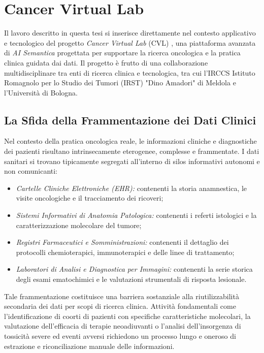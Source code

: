 \documentclass[12pt,a4paper,openright,twoside]{book}
\begin{document}
\section{Cancer Virtual Lab}
\label{sec:bg-cvl}

Il lavoro descritto in questa tesi si inserisce direttamente nel contesto
applicativo e tecnologico del progetto \textit{Cancer Virtual Lab} (CVL)
\cite{cvl2025platform}, una piattaforma avanzata di \textit{AI Semantica}
progettata per supportare la ricerca oncologica e la pratica clinica guidata dai
dati. Il progetto è frutto di una collaborazione multidisciplinare tra enti di
ricerca clinica e tecnologica, tra cui l'IRCCS Istituto Romagnolo per lo Studio
dei Tumori (IRST) "Dino Amadori" di Meldola e l'Università di Bologna.

\subsection{La Sfida della Frammentazione dei Dati Clinici}
Nel contesto della pratica oncologica reale, le informazioni cliniche e
diagnostiche dei pazienti risultano intrinsecamente eterogenee, complesse e
frammentate. I dati sanitari si trovano tipicamente segregati all'interno di
silos informativi autonomi e non comunicanti:
\begin{itemize}
    \item \textit{Cartelle Cliniche Elettroniche (EHR):} contenenti la storia
          anamnestica, le visite oncologiche e il tracciamento dei ricoveri;
    \item \textit{Sistemi Informativi di Anatomia Patologica:} contenenti i
          referti istologici e la caratterizzazione molecolare del tumore;
    \item \textit{Registri Farmaceutici e Somministrazioni:} contenenti il
          dettaglio dei protocolli chemioterapici, immunoterapici e delle linee
          di trattamento;
    \item \textit{Laboratori di Analisi e Diagnostica per Immagini:} contenenti
          la serie storica degli esami ematochimici e le valutazioni strumentali
          di risposta lesionale.
\end{itemize}

Tale frammentazione costituisce una barriera sostanziale alla riutilizzabilità
secondaria dei dati per scopi di ricerca clinica. Attività fondamentali come
l'identificazione di coorti di pazienti con specifiche caratteristiche
molecolari, la valutazione dell'efficacia di terapie neoadiuvanti o l'analisi
dell'insorgenza di tossicità severe ed eventi avversi richiedono un processo
lungo e oneroso di estrazione e riconciliazione manuale delle informazioni.
\end{document}
